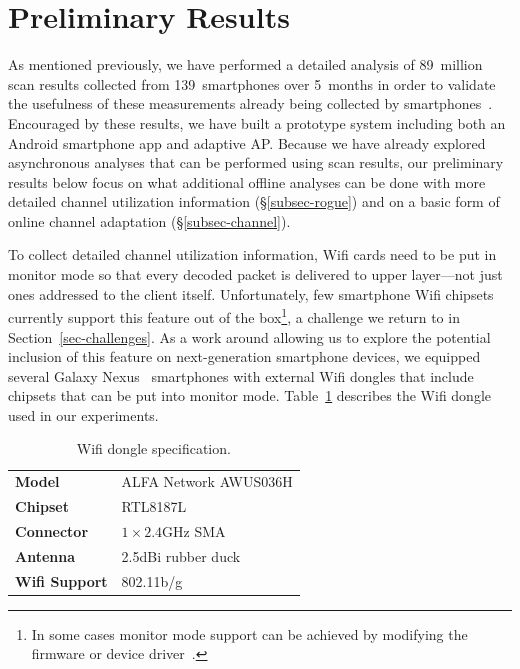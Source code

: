 \section{Preliminary Results}
\label{sec-results}

As mentioned previously, we have performed a detailed analysis of 89~million
scan results collected from 139~smartphones over 5~months in order to
validate the usefulness of these measurements already being collected by
smartphones~\cite{conext14-pocketsniffer}. Encouraged by these results, we
have built a prototype \PS{} system including both an Android smartphone app
and adaptive AP. Because we have already explored asynchronous analyses that
can be performed using scan results, our preliminary results below focus on
what additional offline analyses can be done with more detailed channel
utilization information (\S\ref{subsec-rogue}) and on a basic form of online
channel adaptation (\S\ref{subsec-channel}).

To collect detailed channel utilization information, Wifi cards need to be
put in monitor mode so that every decoded packet is delivered to upper
layer---not just ones addressed to the client itself. Unfortunately, few
smartphone Wifi chipsets currently support this feature out of the
box\footnote{In some cases monitor mode support can be achieved by modifying
the firmware or device driver~\cite{bcmon}.}, a challenge we return to in
Section~\ref{sec-challenges}. As a work around allowing us to explore the
potential inclusion of this feature on next-generation smartphone devices, we
equipped several Galaxy Nexus~\cite{galaxynexus} smartphones with external
Wifi dongles that include chipsets that can be put into monitor mode.
Table~\ref{tab:dongle} describes the Wifi dongle used in our experiments.

\begin{table}[t!]
  \centering
  \caption{Wifi dongle specification.}
  \label{tab:dongle}
  \begin{tabular}{ll}
    \toprule
    \textbf{Model} & ALFA Network AWUS036H \\
    \textbf{Chipset} & RTL8187L \\
    \textbf{Connector} & $1\times2.4$GHz SMA \\
    \textbf{Antenna} & 2.5dBi rubber duck \\
    \textbf{Wifi Support} & 802.11b/g \\
    \bottomrule
  \end{tabular}
  \vspace{-3mm}
\end{table}


